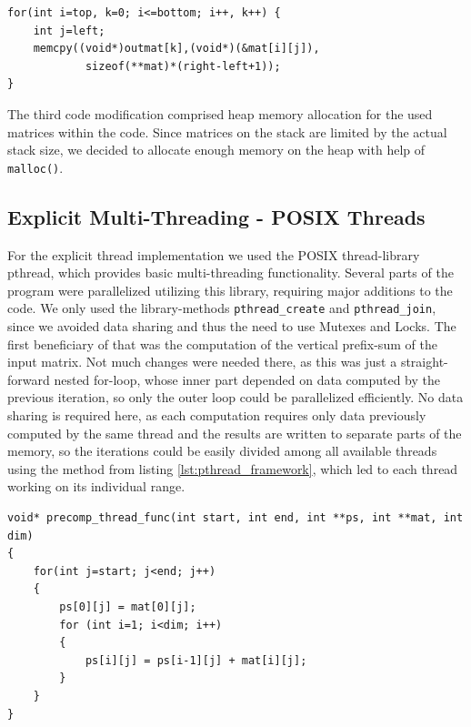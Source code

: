 \documentclass[conference]{IEEEtran}
\begin{document}
\begin{center}
   \begin{lstlisting}[captionpos=b, caption=Optimized Implementation: Initialize Output Matrix, label=lst:outmat-opt]  
for(int i=top, k=0; i<=bottom; i++, k++) {                                       
    int j=left;                                                                                    
    memcpy((void*)outmat[k],(void*)(&mat[i][j]),
            sizeof(**mat)*(right-left+1));                                          
}                                                 
   \end{lstlisting}
\end{center}
   
The third code modification comprised heap memory allocation for the used matrices within the code. Since matrices on the stack are limited by the actual stack size, we decided to allocate enough memory on the heap with help of \texttt{malloc()}.

   
\subsection{Explicit Multi-Threading - POSIX Threads}
\label{sec:impl:pthread}

For the explicit thread implementation we used the POSIX thread-library pthread, which provides basic multi-threading functionality. Several parts of the program were parallelized utilizing this library, requiring major additions to the code. We only used the library-methods \texttt{pthread\_create} and \texttt{pthread\_join}, since we avoided data sharing and thus the need to use Mutexes and Locks.
The first beneficiary of that was the computation of the vertical prefix-sum of the input matrix. Not much changes were needed there, as this was just a straight-forward nested for-loop, whose inner part depended on data computed by the previous iteration, so only the outer loop could be parallelized efficiently. No data sharing is required here, as each computation requires only data previously computed by the same thread and the results are written to separate parts of the memory, so the iterations could be easily divided among all available threads using the method from listing \ref{lst:pthread_framework}, which led to each thread working on its individual range.

\begin{center}
   \begin{lstlisting}[captionpos=b, caption=pthread: Parallel Matrix Pre-Computation of the Vertical Sum (simplified) - the variables \texttt{start} and \texttt{end} are used to equally divide the work among all available threads and to specify where the work of a thread begins and ends., label=lst:pthread_precomp]
void* precomp_thread_func(int start, int end, int **ps, int **mat, int dim)
{
    for(int j=start; j<end; j++)
    {
        ps[0][j] = mat[0][j];
        for (int i=1; i<dim; i++)
        {
            ps[i][j] = ps[i-1][j] + mat[i][j];
        }
    }
}
   \end{lstlisting}
\end{center}
\end{document}
